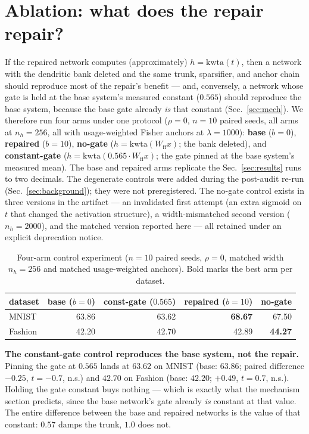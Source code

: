 \documentclass[review,12pt,number]{elsarticle}
\begin{document}
\section{Ablation: what does the repair repair?}
\label{sec:ablation}

If the repaired network computes (approximately) $h = \mathrm{kwta}(t)$,
then a network with the dendritic bank deleted and the same trunk,
sparsifier, and anchor chain should reproduce most of the repair's
benefit --- and, conversely, a network whose gate is held at the base
system's measured constant ($0.565$) should reproduce the base system,
because the base gate already \emph{is} that constant
(Sec.~\ref{sec:mech}). We therefore run four arms under one protocol
($\rho{=}0$, $n{=}10$ paired seeds, all arms at $n_h{=}256$, all with
usage-weighted Fisher anchors at $\lambda{=}1000$): \textbf{base}
($b{=}0$), \textbf{repaired} ($b{=}10$), \textbf{no-gate}
($h = \mathrm{kwta}(W_{\mathrm{ff}} x)$; the bank deleted), and
\textbf{constant-gate} ($h = \mathrm{kwta}(0.565 \cdot
W_{\mathrm{ff}} x)$; the gate pinned at the base system's measured
mean). The base and repaired arms replicate the Sec.~\ref{sec:results}
runs to two decimals. The degenerate controls were added during the
post-audit re-run (Sec.~\ref{sec:background}); they were not
preregistered. The no-gate control exists in three versions in the
artifact --- an invalidated first attempt (an extra sigmoid on $t$ that
changed the activation structure), a width-mismatched second version
($n_h{=}2000$), and the matched version reported here --- all retained
under an explicit deprecation notice.

\begin{table}[t]
\centering
\caption{Four-arm control experiment ($n{=}10$ paired seeds,
$\rho{=}0$, matched width $n_h{=}256$ and matched usage-weighted
anchors). Bold marks the best arm per dataset.}
\label{tab:ablation}
\begin{tabular}{lrrrr}
\toprule
dataset & base ($b{=}0$) & const-gate ($0.565$) & repaired ($b{=}10$)
& no-gate \\
\midrule
MNIST   & 63.86 & 63.62 & \textbf{68.67} & 67.50 \\
Fashion & 42.20 & 42.70 & 42.89 & \textbf{44.27} \\
\bottomrule
\end{tabular}
\end{table}

\textbf{The constant-gate control reproduces the base system, not the
repair.} Pinning the gate at $0.565$ lands at $63.62$ on MNIST (base:
$63.86$; paired difference $-0.25$, $t{=}-0.7$, n.s.) and $42.70$ on
Fashion (base: $42.20$; $+0.49$, $t{=}0.7$, n.s.). Holding the gate
constant buys nothing --- which is exactly what the mechanism section
predicts, since the base network's gate already \emph{is} constant at
that value. The entire difference between the base and repaired
networks is the value of that constant: $0.57$ damps the trunk,
$1.0$ does not.
\end{document}
